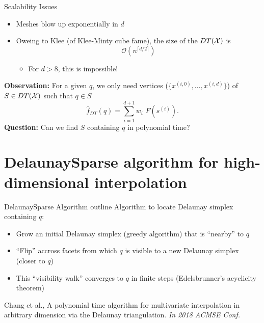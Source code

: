 \documentclass[aspectratio=169]{beamer}
\begin{document}
\begin{frame}{Scalability Issues}
\begin{itemize}
\item Meshes blow up exponentially in $d$
\item Oweing to Klee (of Klee-Minty cube fame),
the size of the $DT({\cal X})$ is
$$
\mathcal{O}\left(n^{\lceil d/2 \rceil}\right)
$$
\begin{itemize}
\item For $d > 8$, this is impossible!
\end{itemize}
\end{itemize}
\pause
{\textbf{Observation:}
For a given $q$, we only need vertices
($\{x^{(i,0)}, \ldots, x^{(i,d)}\}$) of $S \in DT({\cal X})$
such that $q\in S$}
$$
{\hat f}_{DT}(q) = \sum_{i=1}^{d+1} w_i\text{~}F(s^{(i)}).
$$
\medskip
\pause
{\textbf{Question:} Can we find $S$ containing $q$ in polynomial time?}
\end{frame}

\section{DelaunaySparse algorithm for high-dimensional interpolation}

\begin{frame}{DelaunaySparse Algorithm outline}
Algorithm to locate Delaunay simplex containing $q$:
\begin{itemize}
\item Grow an initial Delaunay simplex (greedy algorithm) that is
``nearby'' to $q$
\item ``Flip'' accross facets from which $q$ is visible to a new Delaunay
simplex (closer to $q$)
\item This ``visibility walk'' converges to $q$ in finite steps
(Edelsbrunner's acyclicity theorem)
\end{itemize}
\vfill
{\tiny Chang et al.,
A polynomial time algorithm for multivariate interpolation in arbitrary
dimension via the Delaunay triangulation.
{\sl In 2018 ACMSE Conf.}}
\end{frame}
\end{document}
